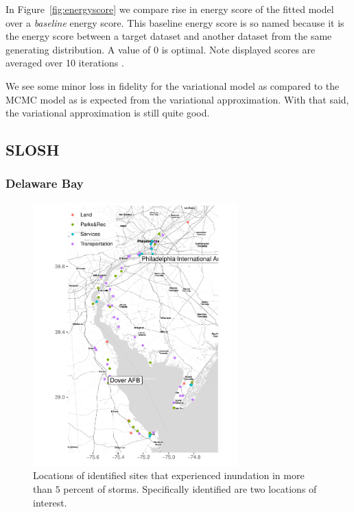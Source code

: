     In Figure~\ref{fig:energyscore} we compare rise in energy score of the fitted
    model over a \emph{baseline} energy score.  This baseline energy score is so
    named because it is the energy score between a target dataset and another
    dataset from the same generating distribution.  A value of 0 is optimal.
      Note displayed scores are 
    averaged over 10 iterations .
    
    We see some minor loss in fidelity for the variational model as compared to 
    the MCMC model as is expected from the variational approximation.  With that
    said, the variational approximation is still quite good.

\subsection{SLOSH}
\subsubsection{Delaware Bay}

\begin{figure}[ht]
    \caption{Locations of identified sites that experienced inundation in more than 
        $5$ percent of storms.  Specifically identified are two locations of 
        interest.  \label{map:delawarebay}}
    \centering
    \includegraphics[height=4in]{./plots/delaware}
\end{figure}

